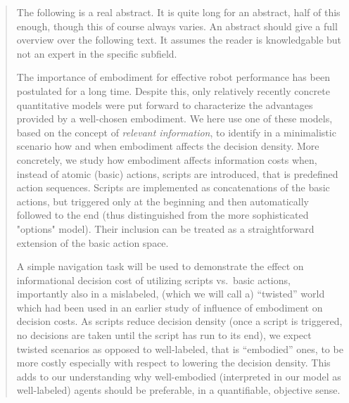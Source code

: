 \begin{abstract}
	The following is a real abstract. It is quite long for an abstract, half of this enough, though this of course always varies. An abstract should give a full overview over the following text. It assumes the reader is knowledgable but not an expert in the specific subfield.
	
	The importance of embodiment for effective robot performance has been postulated for a long time. Despite this, only relatively recently concrete quantitative models were put forward to characterize the advantages provided by a well-chosen embodiment. We here use one of these models, based on the concept of \emph{relevant information}, to identify in a minimalistic scenario how and when embodiment affects the decision density. More concretely, we study how embodiment affects information costs when, instead of atomic (basic) actions, scripts are introduced, that is predefined action sequences. Scripts are implemented as concatenations of the basic actions, but triggered only at the beginning and then automatically followed to the end (thus distinguished from the more sophisticated "options" model). Their inclusion can be treated as a straightforward extension of the basic action space.
	
	A simple navigation task will be used to demonstrate the effect on informational decision cost of utilizing scripts vs.\ basic actions, importantly also in a mislabeled, (which we will call a) ``twisted'' world which had been used in an earlier study of influence of embodiment on decision costs. As scripts reduce decision density (once a script is triggered, no decisions are taken until the script has run to its end), we expect twisted scenarios as opposed to well-labeled, that is ``embodied'' ones, to be more costly especially with respect to lowering the decision density. This adds to our understanding why well-embodied (interpreted in our model as well-labeled) agents should be preferable, in a quantifiable, objective sense.  	  
\end{abstract}